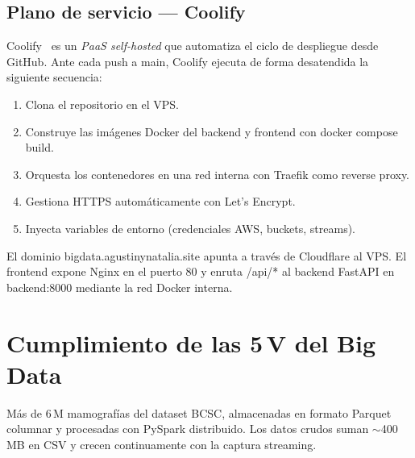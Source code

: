 \documentclass[conference,a4paper,10pt]{IEEEtran}
\newcommand{\code}[1]{{\ttfamily\small\textcolor{hai-primary-dark}{#1}}}
\begin{document}
\subsection{Plano de servicio --- Coolify}
Coolify~\cite{coolify} es un \emph{PaaS self-hosted} que automatiza el
ciclo de despliegue desde GitHub. Ante cada push a \code{main}, Coolify
ejecuta de forma desatendida la siguiente secuencia:
\begin{enumerate}[leftmargin=*,nosep,label=\arabic*)]
  \item Clona el repositorio en el VPS.
  \item Construye las imágenes Docker del backend y frontend con \code{docker compose build}.
  \item Orquesta los contenedores en una red interna con Traefik como reverse proxy.
  \item Gestiona HTTPS automáticamente con Let's Encrypt.
  \item Inyecta variables de entorno (credenciales AWS, buckets, streams).
\end{enumerate}
El dominio \code{bigdata.agustinynatalia.site} apunta a través de
Cloudflare al VPS. El frontend expone Nginx en el puerto 80 y enruta
\code{/api/*} al backend FastAPI en \code{backend:8000} mediante la red
Docker interna.

\section{Cumplimiento de las 5\,V del Big Data}\label{sec:5v}
\newcommand{\vcard}[2]{%
  \begin{tcolorbox}[
    enhanced, sharp corners, breakable,
    colback=white, colframe=hai-rule,
    boxrule=0.4pt, leftrule=2pt,
    coltitle=white, colbacktitle=hai-primary,
    title={\strut\scshape\bfseries\footnotesize #1},
    fonttitle=\footnotesize,
    halign title=flush left,
    left=6pt, right=6pt, top=3pt, bottom=3pt,
    boxsep=0pt,
    attach boxed title to top left={xshift=4pt,yshift=-1pt},
    boxed title style={sharp corners,colframe=hai-primary,
      left=4pt,right=4pt,top=1pt,bottom=1pt},
    after title={\hfill},
    fontupper=\footnotesize,
    top=12pt,
  ]%
  #2%
  \end{tcolorbox}\par\vspace{2pt}%
}

\vcard{Volumen}{Más de 6\,M mamografías del dataset BCSC, almacenadas en formato Parquet columnar y procesadas con PySpark distribuido. Los datos crudos suman $\sim$400\,MB en CSV y crecen continuamente con la captura streaming.}
\end{document}
